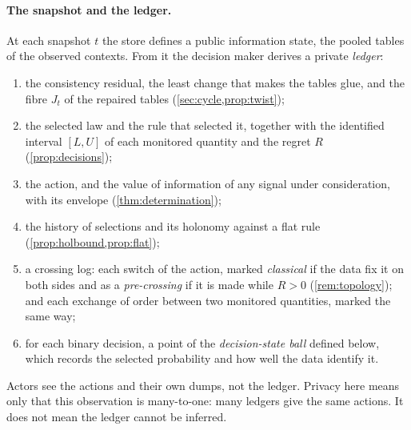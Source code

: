 \documentclass[11pt]{article}
\theoremstyle{definition}\newtheorem{definition}[theorem]{Definition}\newtheorem{remark}[theorem]{Remark}\newtheorem{example}[theorem]{Example}\newtheorem{problem}[theorem]{Open problem}\crefname{problem}{Problem}{Problems}
\begin{document}
\paragraph{The snapshot and the ledger.} At each snapshot $t$ the store defines a public information state, the pooled tables of
the observed contexts. From it the decision maker derives a private \emph{ledger}:
\begin{enumerate}
\item the consistency residual, the least change that makes the tables glue, and the fibre $J_t$ of the repaired tables (\cref{sec:cycle,prop:twist});
\item the selected law and the rule that selected it, together with the identified interval $[L,U]$ of each monitored quantity and the regret $R$ (\cref{prop:decisions});
\item the action, and the value of information of any signal under consideration, with its envelope (\cref{thm:determination});
\item the history of selections and its holonomy against a flat rule (\cref{prop:holbound,prop:flat});
\item a crossing log: each switch of the action, marked \emph{classical} if the data fix it on both sides and as a \emph{pre-crossing} if it is made while $R>0$ (\cref{rem:topology}); and each exchange of order between two monitored quantities, marked the same way;
\item for each binary decision, a point of the \emph{decision-state ball} defined below, which records the selected probability and how well the data identify it.
\end{enumerate}
Actors see the actions and their own dumps, not the ledger. Privacy here means only that this observation is many-to-one: many ledgers
give the same actions. It does not mean the ledger cannot be inferred.
\end{document}
